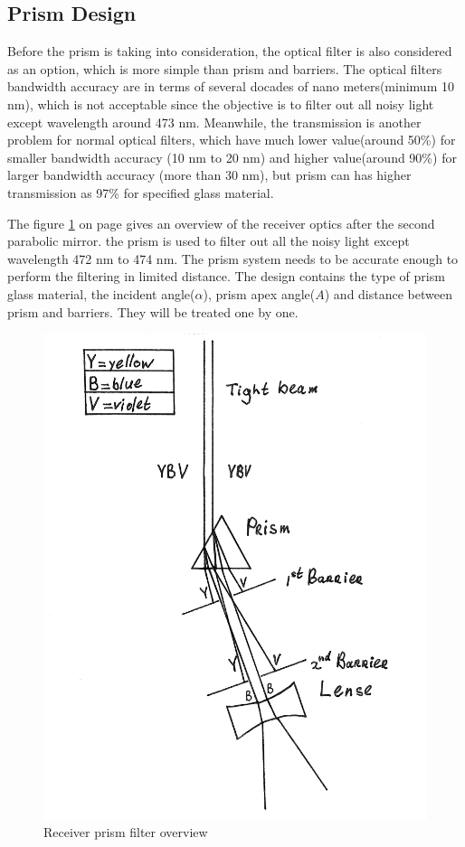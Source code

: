 \subsection{Prism Design}
\label{prism}
Before the prism is taking into consideration, the optical filter is also considered as an option, which is more simple than prism and barriers. The optical filters bandwidth accuracy are in terms of several docades of nano meters(minimum 10 nm\cite{optical_filter}), which is not acceptable since the objective is to filter out all noisy light except wavelength around 473 nm. Meanwhile, the transmission is another problem for normal optical filters, which have much lower value(around 50\%) for smaller bandwidth accuracy (10 nm to 20 nm) and higher value(around 90\%) for larger bandwidth accuracy (more than 30 nm), but prism can has higher transmission as 97\% for specified glass material.

The figure \ref{fig:prism} on page \pageref{fig:prism} gives an overview of the receiver optics after the second parabolic mirror. the prism is used to filter out all the noisy light except wavelength 472 nm to 474 nm. The prism system needs to be accurate enough to perform the filtering in limited distance. The design contains the type of prism glass material, the incident angle($\alpha$), prism apex angle($A$) and distance between prism and barriers. They will be treated one by one.

\begin{figure}[ht!]
\centering
\includegraphics[scale = 0.6]{chapters/img/Prism.png}
\caption{Receiver prism filter overview}
\label{fig:prism}
\end{figure} 


